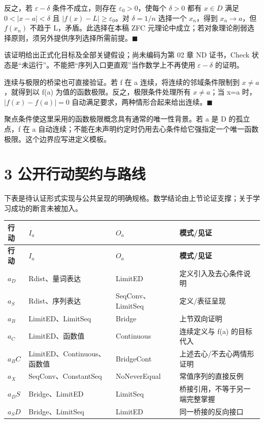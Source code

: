 \documentclass[UTF8,a4paper,zihao=-4,fontset=windows,openany]{ctexbook}
\def\mathrm#1{#1}%
\begin{document}
反之，若 \(\varepsilon-\delta\) 条件不成立，则存在 \(\varepsilon_{0}>0\)，使每个 \(\delta>0\) 都有 \(x\in D\) 满足 \(0<|x-a|<\delta\) 且 \(|f(x)-L|\ge\varepsilon_{0}\)。对 \(\delta=1/n\) 选择一个 \(x_n\)，得到 \(x_n\to a\)，但 \(f(x_n)\) 不趋于 L，矛盾。此选择在本稿 ZFC 元理论中成立；若对象理论削弱选择原则，须另外提供序列选择所需前提。\(\blacksquare\)

该证明给出正式化目标及全部关键假设；尚未编码为第 02 章 ND 证书，Check 状态是“未运行”。不能把“序列入口更直观”当作数学上不再使用 \(\varepsilon-\delta\) 的证明。

连续与极限的桥梁也可直接验证。若 f 在 a 连续，将连续的邻域条件限制到 \(x\ne a\)，就得到以 f(a) 为值的函数极限。反之，极限条件处理所有 \(x\ne a\)；当 x=a 时，\(|f(x)-f(a)|=0\) 自动满足要求，两种情形合起来给出连续。\(\blacksquare\)

聚点条件使这里采用的函数极限概念具有通常的唯一性背景。若 a 是 D 的孤立点，f 在 a 自动连续；不能在未声明约定时仍用去心条件给它强指定一个唯一函数极限。这个边界应写进定义模板。

\section{3 公开行动契约与路线}
下表是待认证形式实现与公共呈现的明确规格。数学结论由上节论证支撑；关于学习成功的断言未被加入。

\begingroup\small\setlength{\tabcolsep}{4pt}
\begin{longtable}{l>{\raggedright\arraybackslash}p{}>{\raggedright\arraybackslash}p{}>{\raggedright\arraybackslash}p{}}
\toprule
\textbf{行动} & \textbf{\(I_a\)} & \textbf{\(O_a\)} & \textbf{模式/见证} \\
\midrule
\endfirsthead
\toprule
\textbf{行动} & \textbf{\(I_a\)} & \textbf{\(O_a\)} & \textbf{模式/见证} \\
\midrule
\endhead
\bottomrule
\endfoot
\bottomrule
\endlastfoot
\(a_D\) & Rdist、量词表达 & LimitED & 定义引入及去心条件说明 \\
\(a_S\) & Rdist、序列表达 & SeqConv、LimitSeq & 定义/表征呈现 \\
\(a_B\) & LimitED、LimitSeq & Bridge & 上节双向证明 \\
\(a_C\) & LimitED、函数值 & Continuous & 连续定义与 f(a) 的目标代入 \\
\(a_\mathrm{BC}\) & LimitED、Continuous、函数值 & BridgeCont & 上述去心/不去心两情形证明 \\
\(a_X\) & SeqConv、ConstantSeq & NoNeverEqual & 常值序列的直接反例 \\
\(a_\mathrm{DS}\) & Bridge、LimitED & LimitSeq & 桥接引用，不等于另一端完整掌握 \\
\(a_\mathrm{SD}\) & Bridge、LimitSeq & LimitED & 同一桥接的反向接口 \\
\end{longtable}
\endgroup
\end{document}
